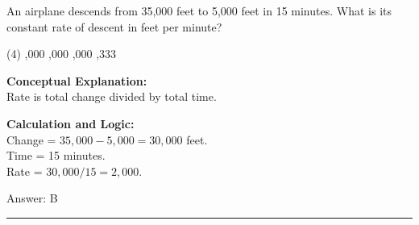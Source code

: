 \documentclass[11pt,paper=a4,answers]{exam}
\begin{document}
\begin{questions}
\question
An airplane descends from 35,000 feet to 5,000 feet in 15 minutes. What is its constant rate of descent in feet per minute?
\begin{tasks}(4)
    ,000
    ,000
    ,000
    ,333
\end{tasks}

\begin{solution}
\textbf{Conceptual Explanation:} \\
Rate is total change divided by total time.

\vspace{10pt}
\textbf{Calculation and Logic:} \\
Change = $35,000 - 5,000 = 30,000$ feet. \\
Time = 15 minutes. \\
Rate = $30,000 / 15 = 2,000$.

\vspace{15pt}
Answer: \colorbox{yellow!100}{B}
\end{solution}










\end{questions}
\begin{center}
\rule{.5\textwidth}{1pt}
\end{center}
\end{document}
